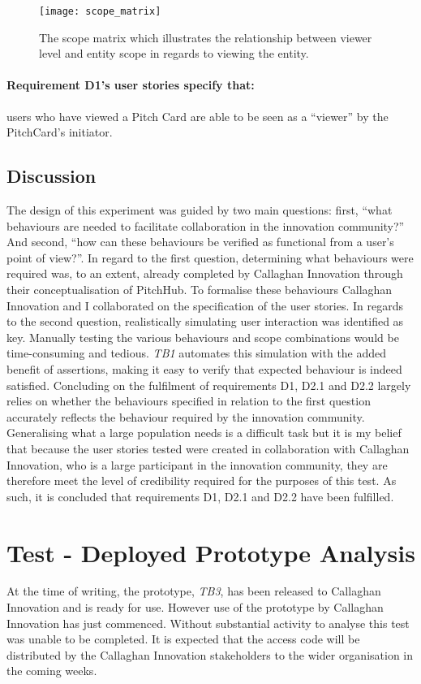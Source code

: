 \begin{figure}[ht]
    \centering
    \texttt{[image: scope\_matrix]}
    \caption{The scope matrix which illustrates the relationship between viewer level and entity scope in regards to viewing the entity.}
    \label{fig:architecturescope_matrix_evaluation}
\end{figure}

\paragraph{Requirement D1's user stories specify that:} users who have viewed a Pitch Card are able to be seen as a ``viewer'' by the PitchCard's initiator.

\subsection{Discussion}
The design of this experiment was guided by two main questions: first, ``what behaviours are needed to facilitate collaboration in the innovation community?'' And second, ``how can these behaviours be verified as functional from a user's point of view?''. In regard to the first question, determining what behaviours were required was, to an extent, already completed by Callaghan Innovation through their conceptualisation of PitchHub. To formalise these behaviours Callaghan Innovation and I collaborated on the specification of the user stories.
In regards to the second question, realistically simulating user interaction was identified as key. Manually testing the various behaviours and scope combinations would be time-consuming and tedious. \textit{TB1} automates this simulation with the added benefit of assertions, making it easy to verify that expected behaviour is indeed satisfied.
Concluding on the fulfilment of requirements D1, D2.1 and D2.2 largely relies on whether the behaviours specified in relation to the first question accurately reflects the behaviour required by the innovation community. Generalising what a large population needs is a difficult task but it is my belief that because the user stories tested were created in collaboration with Callaghan Innovation, who is a large participant in the innovation community, they are therefore meet the level of credibility required for the purposes of this test. As such, it is concluded that requirements D1, D2.1 and D2.2 have been fulfilled.

\section{Test  - Deployed Prototype Analysis}\label{S:test_2}
At the time of writing, the prototype, \textit{TB3}, has been released to Callaghan Innovation and is ready for use. However use of the prototype by Callaghan Innovation has just commenced. Without substantial activity to analyse this test was unable to be completed. It is expected that the access code will be distributed by the Callaghan Innovation stakeholders to the wider organisation in the coming weeks.


